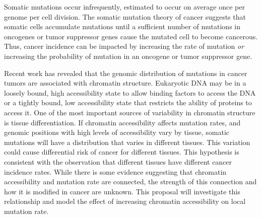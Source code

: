 
Somatic mutations occur infrequently, estimated to occur on average once per genome per cell division.
The somatic mutation theory of cancer suggests that somatic cells accumulate mutations until a sufficient number of mutations in oncogenes or tumor suppressor genes cause the mutated cell to become cancerous.
Thus, cancer incidence can be impacted by increasing the rate of mutation \textit{or} increasing the probability of mutation in an oncogene or tumor suppressor gene.

Recent work has revealed that the genomic distribution of mutations in cancer tumors are associated with chromatin structure.
Eukaryotic DNA may be in a loosely bound, high accessibility state to allow binding factors to access the DNA or
a tightly bound, low accessibility state that restricts the ability of proteins to access it.
One of the most important sources of variability in chromatin structure is tissue differentiation.
If chromatin accessibility affects mutation rates, and genomic positions with high levels of accessibility vary by tissue, somatic mutations will have a distribution that varies in different tissues.
This variation could cause differential risk of cancer for different tissues.
This hypothesis is consistent with the observation that different tissues have different cancer incidence rates.
While there is some evidence suggesting that chromatin accessibility and mutation rate are connected, the strength of this connection and how it is modified in cancer are unknown.
This proposal will investigate this relationship and model the effect of increasing chromatin accessibility on local mutation rate.

